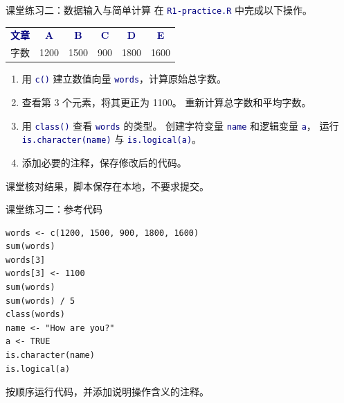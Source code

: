 \documentclass[14pt,compress,t,noamsthm,notheorem,table,handout,fontset=none]{ctexbeamer}
\newcommand{\code}[1]{\textcolor{navy}{\texttt{#1}}}
\newcommand{\thead}[1]{\textcolor{navy}{\textbf{#1}}}
\begin{document}
\begin{frame}{课堂练习二：数据输入与简单计算}
  \small
  在 \code{R1-practice.R} 中完成以下操作。
  \par\vspace{0.2em}
  \renewcommand{\arraystretch}{1.2}
  \begin{tabular*}{\linewidth}{@{\extracolsep{\fill}}lccccc@{}}
    \toprule
    \thead{文章} & \thead{A} & \thead{B} & \thead{C} & \thead{D} & \thead{E} \\
    字数 & 1200 & 1500 & 900 & 1800 & 1600 \\
    \bottomrule
  \end{tabular*}\par
  \vspace{0.2em}
  \begin{enumerate}
    \item 用 \code{c()} 建立数值向量 \code{words}，计算原始总字数。
    \item 查看第 3 个元素，将其更正为 1100。
      重新计算总字数和平均字数。
    \item 用 \code{class()} 查看 \code{words} 的类型。
      创建字符变量 \code{name} 和逻辑变量 \code{a}，
      运行 \code{is.character(name)} 与 \code{is.logical(a)}。
    \item 添加必要的注释，保存修改后的代码。
  \end{enumerate}
  \vfill
  课堂核对结果，脚本保存在本地，不要求提交。
\end{frame}

\begin{frame}[fragile]{课堂练习二：参考代码}
\begin{lstlisting}
words <- c(1200, 1500, 900, 1800, 1600)
sum(words)
words[3]
words[3] <- 1100
sum(words)
sum(words) / 5
class(words)
name <- "How are you?"
a <- TRUE
is.character(name)
is.logical(a)
\end{lstlisting}
  \vfill
  按顺序运行代码，并添加说明操作含义的注释。
\end{frame}
\end{document}

